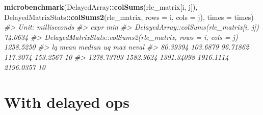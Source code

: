 \documentclass[]{book}
\newenvironment{Shaded}{\begin{snugshade}}{\end{snugshade}}
\newcommand{\KeywordTok}[1]{\textcolor[rgb]{0.13,0.29,0.53}{\textbf{#1}}}
\newcommand{\DataTypeTok}[1]{\textcolor[rgb]{0.13,0.29,0.53}{#1}}
\newcommand{\CommentTok}[1]{\textcolor[rgb]{0.56,0.35,0.01}{\textit{#1}}}
\newcommand{\OperatorTok}[1]{\textcolor[rgb]{0.81,0.36,0.00}{\textbf{#1}}}
\newcommand{\NormalTok}[1]{#1}
\begin{document}
\begin{Shaded}
\begin{Highlighting}[]
\KeywordTok{microbenchmark}\NormalTok{(DelayedArray}\OperatorTok{::}\KeywordTok{colSums}\NormalTok{(rle_matrix[i, j]),}
\NormalTok{               DelayedMatrixStats}\OperatorTok{::}\KeywordTok{colSums2}\NormalTok{(rle_matrix, }\DataTypeTok{rows =}\NormalTok{ i, }\DataTypeTok{cols =}\NormalTok{ j),}
               \DataTypeTok{times =}\NormalTok{ times)}
\CommentTok{#> Unit: milliseconds}
\CommentTok{#>                                                          expr       min}
\CommentTok{#>                       DelayedArray::colSums(rle_matrix[i, j])   74.0634}
\CommentTok{#>  DelayedMatrixStats::colSums2(rle_matrix, rows = i, cols = j) 1258.5250}
\CommentTok{#>          lq      mean     median        uq       max neval}
\CommentTok{#>    80.39394  103.6879   96.71862  117.3074  153.2567    10}
\CommentTok{#>  1278.73703 1582.9624 1391.34098 1916.1114 2196.0357    10}
\end{Highlighting}
\end{Shaded}

\section{With delayed ops}\label{with-delayed-ops}
\end{document}
